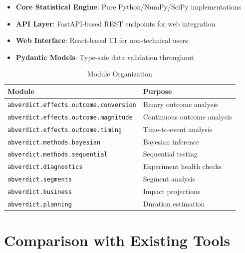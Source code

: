 \documentclass[10pt,a4paper]{article}
\begin{document}
\begin{itemize}
    \item \textbf{Core Statistical Engine}: Pure Python/NumPy/SciPy implementations
    \item \textbf{API Layer}: FastAPI-based REST endpoints for web integration
    \item \textbf{Web Interface}: React-based UI for non-technical users
    \item \textbf{Pydantic Models}: Type-safe data validation throughout
\end{itemize}

\begin{table}[H]
\centering
\caption{Module Organization}
\begin{tabular}{ll}
\toprule
\textbf{Module} & \textbf{Purpose} \\
\midrule
\texttt{abverdict.effects.outcome.conversion} & Binary outcome analysis \\
\texttt{abverdict.effects.outcome.magnitude} & Continuous outcome analysis \\
\texttt{abverdict.effects.outcome.timing} & Time-to-event analysis \\
\texttt{abverdict.methods.bayesian} & Bayesian inference \\
\texttt{abverdict.methods.sequential} & Sequential testing \\
\texttt{abverdict.diagnostics} & Experiment health checks \\
\texttt{abverdict.segments} & Segment analysis \\
\texttt{abverdict.business} & Impact projections \\
\texttt{abverdict.planning} & Duration estimation \\
\bottomrule
\end{tabular}
\end{table}

\section*{Comparison with Existing Tools}
\end{document}
